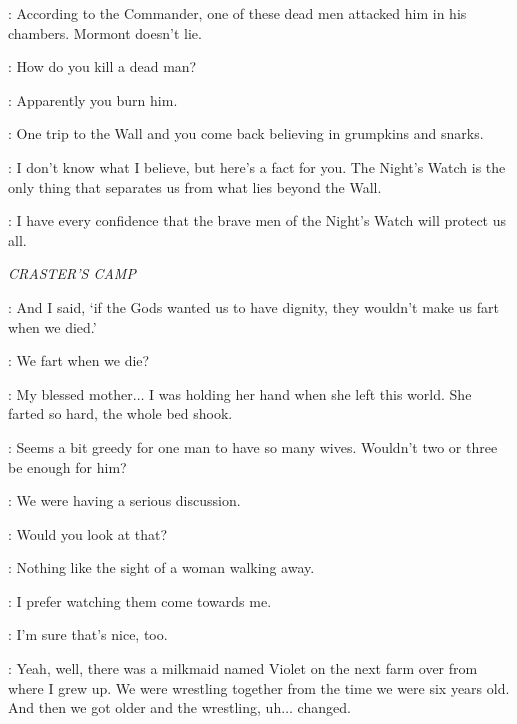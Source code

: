 
\TYRION: According to the Commander, one of these dead men attacked him in his chambers. Mormont doesn't lie.


\VARYS: How do you kill a dead man?

\TYRION: Apparently you burn him.

\CERSEI: One trip to the Wall and you come back believing in grumpkins and snarks.

\TYRION: I don't know what I believe, but here's a fact for you. The Night's Watch is the only thing that separates us from what lies beyond the Wall.

\CERSEI: I have every confidence that the brave men of the Night's Watch will protect us all.



\scene

\textit{CRASTER'S CAMP}


\EDD: And I said, `if the Gods wanted us to have dignity, they wouldn't make us fart when we died.'

\GRENN: We fart when we die?

\EDD: My blessed mother$\ldots$ I was holding her hand when she left this world. She farted so hard, the whole bed shook.


\SAM: Seems a bit greedy for one man to have so many wives. Wouldn't two or three be enough for him?

\EDD: We were having a serious discussion.


\GRENN: Would you look at that?

\SAM: Nothing like the sight of a woman walking away.

\GRENN: I prefer watching them come towards me.

\SAM: I'm sure that's nice, too.

\GRENN: Yeah, well, there was a milkmaid named Violet on the next farm over from where I grew up. We were wrestling together from the time we were six years old. And then we got older and the wrestling, uh$\ldots$ changed.

